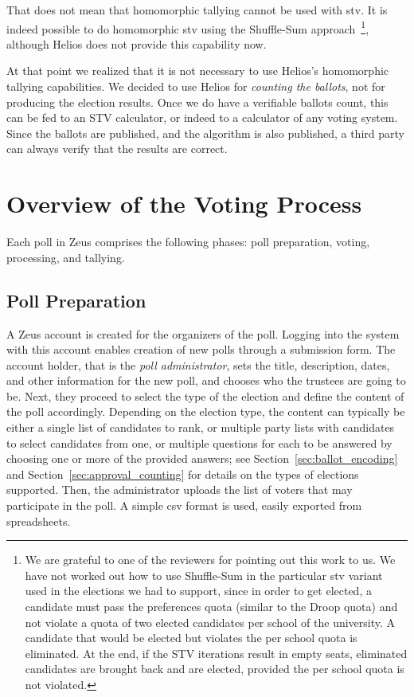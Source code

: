 \documentclass[letterpaper,10pt]{article}
\begin{document}
That does not mean that homomorphic tallying cannot be used with {\sc
  stv}. It is indeed possible to do homomorphic {\sc stv} using the
Shuffle-Sum approach~\cite{benaloh:2009}\footnote{We are grateful to
  one of the reviewers for pointing out this work to us. We have not
  worked out how to use Shuffle-Sum in the particular {\sc stv}
  variant used in the elections we had to support, since in order to
  get elected, a candidate must pass the preferences quota (similar to
  the Droop quota) and not violate a quota of two elected candidates
  per school of the university. A candidate that would be elected but
  violates the per school quota is eliminated. At the end, if the STV
  iterations result in empty seats, eliminated candidates are brought
  back and are elected, provided the per school quota is not violated.
}, although Helios does not provide this capability now.

At that point we realized that it is not necessary to use Helios's
homomorphic tallying capabilities. We decided to use Helios for
\emph{counting the ballots}, not for producing the election results.
Once we do have a verifiable ballots count, this can be fed to an STV
calculator, or indeed to a calculator of any voting system. Since the
ballots are published, and the algorithm is also published, a third
party can always verify that the results are correct.

\section{Overview of the Voting Process}
\label{sec:voting_overview}

Each poll in Zeus comprises the following phases:
poll preparation, voting, processing, and tallying.

\subsection{Poll Preparation}
A Zeus account is created for the organizers of the poll.
Logging into the system with this account enables creation of new polls
through a submission form.
The account holder, that is the \emph{poll administrator},
sets the title, description, dates, and other information for the new
poll, and chooses who the trustees are going to be.
Next, they proceed to select the type of the election and define the
content of the poll accordingly.
Depending on the election type,
the content can typically be either a single list of candidates to rank,
or multiple party lists with candidates to select candidates from one,
or multiple questions for each to be answered by choosing one or more of
the provided answers; see Section~\ref{sec:ballot_encoding} 
and Section~\ref{sec:approval_counting} for details on the types of elections 
supported. Then, the administrator uploads the list of voters that may 
participate in the poll. A simple {\sc csv} format is used, easily 
exported from spreadsheets.
\end{document}
